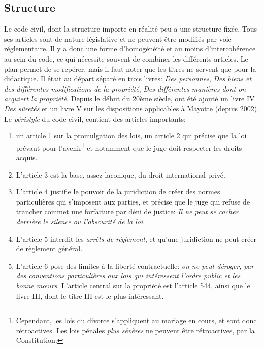 \documentclass[math]{cours}
\begin{document}
\subsection{Structure}
Le code civil, dont la structure importe en réalité peu a une structure fixée.
Tous ses articles sont de nature législative et ne peuvent être modifiés par voie réglementaire.
Il y a donc une forme d'homogénéïté et au moins d'intercohérence au sein du code, ce qui nécessite souvent de combiner les différents articles.
Le plan permet de se repérer, mais il faut noter que les titres ne servent que pour la didactique.
Il était au départ séparé en trois livres: \emph{Des personnes}, \emph{Des biens et des différentes modifications de la propriété}, \emph{Des différentes manières dont on acquiert la propriété}.
Depuis le début du 20ème siècle, ont été ajouté un livre IV \emph{Des sûretés} et un livre V sur les dispositions applicables à Mayotte (depuis 2002).
Le \emph{péristyle} du code civil, contient des articles importants:
\begin{enumerate}
	\item un article 1 sur la promulgation des lois, un article 2 qui précise que la loi prévaut pour l'avenir\footnote{Cependant, les lois du divorce s'appliquent au mariage en cours, et sont donc rétroactives. Les lois pénales \emph{plus sévères} ne peuvent être rétroactives, par la Constitution.} et notamment que le juge doit respecter les droits acquis.
	\item L'article 3 est la base, assez laconique, du droit international privé.
	\item L'article 4 justifie le pouvoir de la juridiction de créer des normes particulières qui s'imposent aux parties, et précise que le juge qui refuse de trancher commet une forfaiture par déni de justice: \emph{Il ne peut se cacher derrière le silence ou l'obscurité de la loi}.
	\item L'article 5 interdit les \emph{arrêts de réglement}, et qu'une juridiction ne peut créer de règlement général.
	\item L'article 6 pose des limites à la liberté contractuelle: \emph{on ne peut déroger, par des conventions particulières aux lois qui intéressent l'ordre public et les bonne m\oe urs}. L'article central sur la propriété est l'article 544, ainsi que le livre III, dont le titre III est le plus intéressant.
\end{enumerate}
\end{document}
